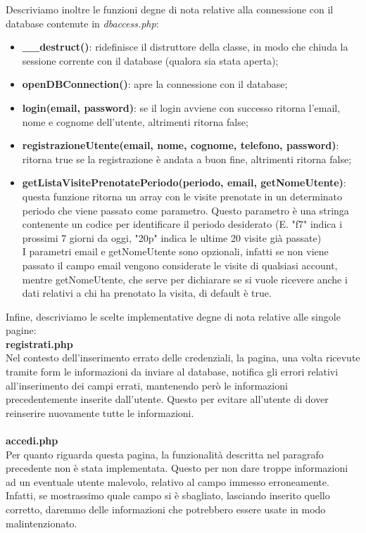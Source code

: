 Descriviamo inoltre le funzioni degne di nota relative alla connessione con il database contenute in \textit{dbaccess.php}:
\begin{itemize}
\item \textbf{\_\_destruct()}: ridefinisce il distruttore della classe, in modo che chiuda la sessione corrente con il database (qualora sia stata aperta);
\item \textbf{openDBConnection()}: apre la connessione con il database;
\item \textbf{login(email, password)}: se il login avviene con successo ritorna l'email, nome e cognome dell'utente, altrimenti ritorna false;
\item \textbf{registrazioneUtente(email, nome, cognome, telefono, password)}: ritorna true se la registrazione è andata a buon fine, altrimenti ritorna false;
\item \textbf{getListaVisitePrenotatePeriodo(periodo, email, getNomeUtente)}: questa funzione ritorna un array con le visite prenotate in un determinato periodo che viene passato come parametro. Questo parametro è una stringa contenente un codice per identificare il periodo desiderato (E. "f7" indica i prossimi 7 giorni da oggi, "20p" indica le ultime 20 visite già passate) \\I parametri email e getNomeUtente sono opzionali, infatti se non viene passato il campo email vengono considerate le visite di qualsiasi account, mentre getNomeUtente, che serve per dichiarare se si vuole ricevere anche i dati relativi a chi ha prenotato la visita, di default è true.
\end{itemize}


Infine, descriviamo le scelte implementative degne di nota relative alle singole pagine: \\

\textbf{registrati.php} \\
Nel contesto dell'inserimento errato delle credenziali, la pagina, una volta ricevute tramite form le informazioni da inviare al database, notifica gli errori relativi all'inserimento dei campi errati, mantenendo però le informazioni precedentemente inserite dall'utente. Questo per evitare all'utente di dover reinserire nuovamente tutte le informazioni. \\ \\

\textbf{accedi.php} \\
Per quanto riguarda questa pagina, la funzionalità descritta nel paragrafo precedente non è stata implementata. Questo per non dare troppe informazioni ad un eventuale utente malevolo, relativo al campo immesso erroneamente. Infatti, se mostrassimo quale campo si è sbagliato, lasciando inserito quello corretto, daremmo delle informazioni che potrebbero essere usate in modo malintenzionato. \\ \\

